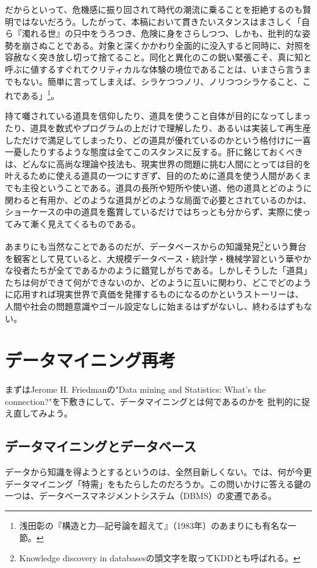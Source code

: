 だからといって、危機感に振り回されて時代の潮流に乗ることを拒絶するのも賢明ではないだろう。したがって、本稿において貫きたいスタンスはまさしく「自ら『濁れる世』の只中をうろつき、危険に身をさらしつつ、しかも、批判的な姿勢を崩さぬことである。対象と深くかかわり全面的に没入すると同時に、対照を容赦なく突き放し切って捨てること。同化と異化のこの鋭い緊張こそ、真に知と呼ぶに値するすぐれてクリティカルな体験の境位であることは、いまさら言うまでもない。簡単に言ってしまえば、シラケつつノリ、ノリつつシラケること、これである」\footnote{浅田彰の『構造と力―記号論を超えて』（1983年）のあまりにも有名な一節。}。

持て囃されている道具を信仰したり、道具を使うこと自体が目的になってしまったり、道具を数式やプログラムの上だけで理解したり、あるいは実装して再生産しただけで満足してしまったり、どの道具が優れているのかという格付けに一喜一憂したりするような態度は全てこのスタンスに反する。肝に銘じておくべきは、どんなに高尚な理論や技法も、現実世界の問題に挑む人間にとっては目的を叶えるために使える道具の一つにすぎず、目的のために道具を使う人間があくまでも主役ということである。道具の長所や短所や使い道、他の道具とどのように関わると有用か、どのような道具がどのような局面で必要とされているのかは、ショーケースの中の道具を鑑賞しているだけではちっとも分からず、実際に使ってみて漸く見えてくるものである。

あまりにも当然なことであるのだが、データベースからの知識発見\footnote{Knowledge discovery in databasesの頭文字を取ってKDDとも呼ばれる。}という舞台を観客として見ていると、大規模データベース・統計学・機械学習という華やかな役者たちが全てであるかのように錯覚しがちである。しかしそうした「道具」たちは何ができて何ができないのか、どのように互いに関わり、どこでどのように応用すれば現実世界で真価を発揮するものになるのかというストーリーは、
人間や社会の問題意識やゴール設定なしに始まるはずがないし、終わるはずもない。

\section{データマイニング再考}
まずはJerome H. Friedmanの"Data mining and Statistics: What's the connection?"を下敷きにして、データマイニングとは何であるのかを
批判的に捉え直してみよう。

\subsection{データマイニングとデータベース}
データから知識を得ようとするというのは、全然目新しくない。では、何が今更データマイニング「特需」をもたらしたのだろうか。この問いかけに答える鍵の一つは、データベースマネジメントシステム（DBMS）の変遷である。

